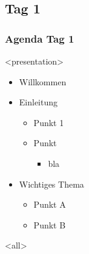 \subsection{Tag 1}
{%

\begin{frame}[fragile]
\frametitle<presentation>{Agenda Tag 1}  %



\mode
<presentation>


\begin{itemize}
\item Willkommen 
\item Einleitung
  \begin{itemize}
  \item Punkt 1
  \item Punkt
\begin{itemize}
\item bla
\end{itemize}
  \end{itemize}

\item Wichtiges Thema 
 \begin{itemize}
 \item Punkt A
 \item Punkt B
 \end{itemize}

\end{itemize}


\mode
<all>


\end{frame}

}
\newpage

